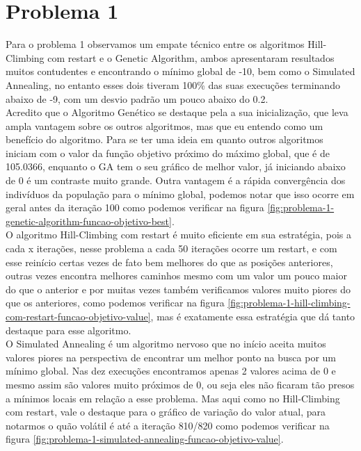 \section[Problema 1]{Problema 1}

Para o problema 1 observamos um empate técnico entre os algoritmos Hill-Climbing com restart e o Genetic Algorithm, ambos apresentaram resultados muitos contudentes e encontrando o mínimo global de -10, bem como o Simulated Annealing, no entanto esses dois tiveram 100\% das suas execuções terminando abaixo de -9, com um desvio padrão um pouco abaixo do 0.2. \\

Acredito que o Algoritmo Genético se destaque pela a sua inicialização, que leva ampla vantagem sobre os outros algoritmos, mas que eu entendo como um benefício do algoritmo. Para se ter uma ideia em quanto outros algoritmos iniciam com o valor da função objetivo próximo do máximo global, que é de 105.0366, enquanto o GA tem o seu gráfico de melhor valor, já iniciando abaixo de 0 é um contraste muito grande. Outra vantagem é a rápida convergência dos indivíduos da população para o mínimo global, podemos notar que isso ocorre em geral antes da iteração 100 como podemos verificar na figura \ref{fig:problema-1-genetic-algorithm-funcao-objetivo-best}. \\

O algoritmo Hill-Climbing com restart é muito eficiente em sua estratégia, pois a cada x iterações, nesse problema a cada 50 iterações ocorre um restart, e com esse reinício certas vezes de fato bem melhores do que as posições anteriores, outras vezes encontra melhores caminhos mesmo com um valor um pouco maior do que o anterior e por muitas vezes também verificamos valores muito piores do que os anteriores, como podemos verificar na figura \ref{fig:problema-1-hill-climbing-com-restart-funcao-objetivo-value}, mas é exatamente essa estratégia que dá tanto destaque para esse algoritmo. \\

O Simulated Annealing é um algoritmo nervoso que no início aceita muitos valores piores na perspectiva de encontrar um melhor ponto na busca por um mínimo global. Nas dez execuções encontramos apenas 2 valores acima de 0 e mesmo assim são valores muito próximos de 0, ou seja eles não ficaram tão presos a mínimos locais em relação a esse problema. Mas aqui como no Hill-Climbing com restart, vale o destaque para o gráfico de variação do valor atual, para notarmos o quão volátil é até a iteração 810/820 como podemos verificar na figura \ref{fig:problema-1-simulated-annealing-funcao-objetivo-value}. \\


